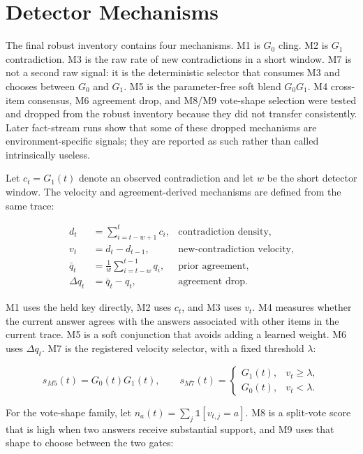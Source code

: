 \documentclass[pdflatex,sn-basic]{sn-jnl}
\theoremstyle{definition}
\newcommand{\ind}[1]{\mathbb{1}\!\left[#1\right]}
\newenvironment{eqbox}%
{\par\vspace{9pt}\noindent\begin{lrbox}{\eqsavebox}\begin{minipage}{\dimexpr\linewidth-18pt}\boldmath}%
{\end{minipage}\end{lrbox}\setlength{\fboxsep}{8pt}\noindent\colorbox{eqgrey}{\usebox{\eqsavebox}}\par\vspace{7pt}}
\begin{document}
\section{Detector Mechanisms}
\label{sec:mechanisms}

The final robust inventory contains four mechanisms. M1 is $G_0$ cling. M2 is $G_1$
contradiction. M3 is the raw rate of new contradictions in a short window. M7 is not a
second raw signal: it is the deterministic selector that consumes M3 and chooses between
$G_0$ and $G_1$. M5 is the parameter-free soft blend $G_0G_1$. M4 cross-item consensus, M6
agreement drop, and M8/M9 vote-shape selection were tested and dropped from the robust
inventory because they did not transfer consistently.
Later fact-stream runs show that some of these dropped mechanisms are environment-specific
signals; they are reported as such rather than called intrinsically useless.

Let $c_t=G_1(t)$ denote an observed contradiction and let $w$ be the short detector window.
The velocity and agreement-derived mechanisms are defined from the same trace:

\begin{eqbox}
\begin{align}
 d_t &= \sum_{i=t-w+1}^{t}c_i, &\text{contradiction density},\\
 v_t &= d_t-d_{t-1}, &\text{new-contradiction velocity},\\
 \bar q_t &= \frac{1}{w}\sum_{i=t-w}^{t-1}q_i, &\text{prior agreement},\\
 \Delta q_t &= \bar q_t-q_t, &\text{agreement drop}.
\end{align}
\end{eqbox}

M1 uses the held key directly, M2 uses $c_t$, and M3 uses $v_t$. M4 measures whether the
current answer agrees with the answers associated with other items in the current trace. M5
is a soft conjunction that avoids adding a learned weight. M6 uses $\Delta q_t$. M7 is the
registered velocity selector, with a fixed threshold $\lambda$:

\begin{eqbox}
\[
s_{M5}(t)=G_0(t)G_1(t),\qquad
s_{M7}(t)=
\begin{cases}
G_1(t),&v_t\geq\lambda,\\
G_0(t),&v_t<\lambda.
\end{cases}
\]
\end{eqbox}

For the vote-shape family, let $n_a(t)=\sum_j\ind{v_{t,j}=a}$. M8 is a split-vote score
that is high when two answers receive substantial support, and M9 uses that shape to choose
between the two gates:
\end{document}
